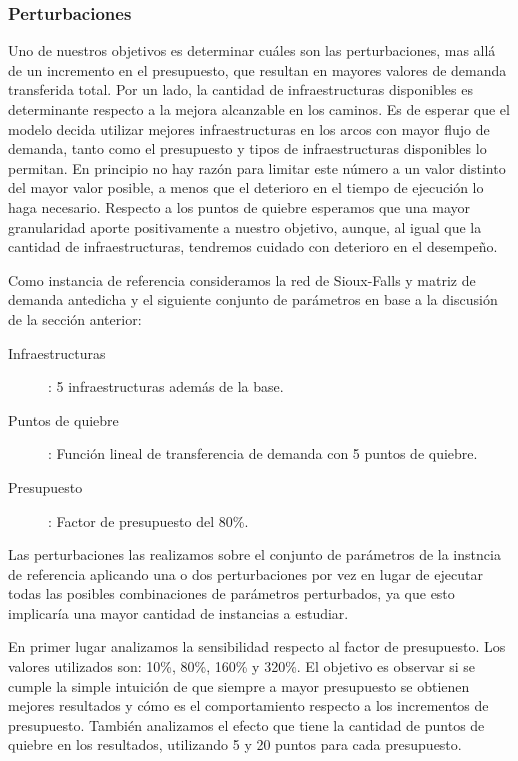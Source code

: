 \documentclass{article}
\begin{document}
  \FloatBarrier
  \subsubsection{Perturbaciones}

  Uno de nuestros objetivos es determinar cuáles son las perturbaciones, mas allá de un incremento en el presupuesto, que resultan en mayores valores de demanda transferida total. Por un lado, la cantidad de infraestructuras disponibles es determinante respecto a la mejora alcanzable en los caminos. Es de esperar que el modelo decida utilizar mejores infraestructuras en los arcos con mayor flujo de demanda, tanto como el presupuesto y tipos de infraestructuras disponibles lo permitan. En principio no hay razón para limitar este número a un valor distinto del mayor valor posible, a menos que el deterioro en el tiempo de ejecución lo haga necesario. Respecto a los puntos de quiebre esperamos que una mayor granularidad aporte positivamente a nuestro objetivo, aunque, al igual que la cantidad de infraestructuras, tendremos cuidado con deterioro en el desempeño.

  Como instancia de referencia consideramos la red de Sioux-Falls y matriz de demanda antedicha y el siguiente conjunto de parámetros en base a la discusión de la sección anterior:

  \begin{description}
    \item[Infraestructuras]: 5 infraestructuras además de la base.
    \item[Puntos de quiebre]: Función lineal de transferencia de demanda con 5 puntos de quiebre.
    \item[Presupuesto]: Factor de presupuesto del 80\%.
  \end{description}

  Las perturbaciones las realizamos sobre el conjunto de parámetros de la instncia de referencia aplicando una o dos perturbaciones por vez en lugar de ejecutar todas las posibles combinaciones de parámetros perturbados, ya que esto implicaría una mayor cantidad de instancias a estudiar.

  En primer lugar analizamos la sensibilidad respecto al factor de presupuesto. Los valores utilizados son: 10\%, 80\%, 160\% y 320\%. El objetivo es observar si se cumple la simple intuición de que siempre a mayor presupuesto se obtienen mejores resultados y cómo es el comportamiento respecto a los incrementos de presupuesto. También analizamos el efecto que tiene la cantidad de puntos de quiebre en los resultados, utilizando 5 y 20 puntos para cada presupuesto.
\end{document}

